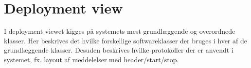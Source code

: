 \section{Deployment view}


I deployment viewet kigges på systemets mest grundlæggende og overordnede klasser. Her beskrives det hvilke forskellige softwareklasser der bruges i hver af de grundlæggende klasser. Desuden beskrives hvilke protokoller der er anvendt i systemet, fx. layout af meddelelser med header/start/stop.   



